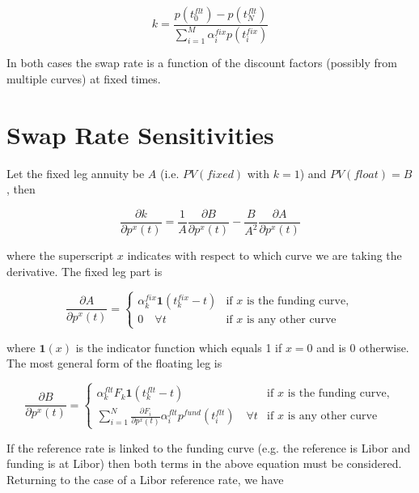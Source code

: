 \begin{equation}
k = \frac{p(t^{flt}_0)-p(t^{flt}_N)}{ \sum^M_{i=1} \alpha^{fix}_ip(t^{fix}_i)}
\end{equation}

In both cases the swap rate is a function of the discount factors (possibly from multiple curves) at fixed times.


\section{Swap Rate Sensitivities}
\label{Sec:SwapRateSense}
Let the fixed leg annuity be $A$ (i.e. $PV(fixed)$ with $k=1$) and $PV(float)=B$, then

\begin{equation}
\label{eqn:SwaprateSense}
\frac{\partial k}{\partial p^x(t)}=\frac{1}{A}\frac{\partial B}{\partial p^x(t)} - \frac{B}{A^2}\frac{\partial A}{\partial p^x(t)} 
\end{equation}

where the superscript $x$ indicates with respect to which curve we are taking the derivative. The fixed leg part is

\begin{equation}
\frac{\partial A}{\partial p^{x}(t)}=
\begin{cases}
\alpha^{fix}_k \mathbf{1}(t^{fix}_k-t)& \text{if $x$ is the funding curve},\\
0 \quad \forall t & \text{if $x$ is any other curve}
\end{cases}
\end{equation}

where $\mathbf{1}(x)$ is the indicator function which equals 1 if  $x=0$ and is 0 otherwise. The most general form of the floating leg is 

\begin{equation}
\label{eqn:FloatSense}
\frac{\partial B}{\partial p^{x}(t)}=
\begin{cases}
\alpha^{flt}_k F_k\mathbf{1}(t^{flt}_k-t)& \text{if $x$ is the funding curve},\\
\sum^N_{i=1} \frac{\partial F_i}{\partial p^{x}(t)} \alpha^{flt}_ip^{fund}(t^{flt}_i) \quad \forall t & \text{if $x$ is any other curve}
\end{cases}
\end{equation}

If the reference rate is linked to the funding curve (e.g. the reference is Libor and funding is at Libor) then both terms in the above equation must be considered. Returning to the case of a Libor reference rate, we have

